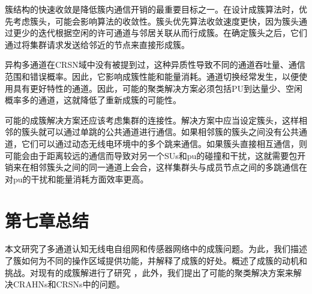 \documentclass[a4paper,AutoFakeBold,oneside,12pt]{book}
\begin{document}
  簇结构的快速收敛是降低簇内通信开销的最重要目标之一。在设计成簇算法时，优先考虑簇头，可能会影响算法的收敛性。簇头优先算法收敛速度更快，因为簇头通过更少的迭代根据空闲的许可通道与邻居关联从而行成簇。在确定簇头之后，它们通过将集群请求发送给邻近的节点来直接形成簇。
  
  异构多通道在CRSN域中没有被提到过，这种异质性导致不同的通道吞吐量、通信范围和错误概率。因此，它影响成簇性能和能量消耗。通道切换经常发生，以便使用具有更好特性的通道。因此，可能的聚类解决方案必须包括PU到达量少、空闲概率多的通道，这就降低了重新成簇的可能性。
  
  可能的成簇解决方案还应该考虑集群的连接性。解决方案中应当设定簇头，这样相邻的簇头就可以通过单跳的公共通道进行通信。如果相邻簇的簇头之间没有公共通道，它们可以通过动态无线电环境中的多个跳来通信。如果簇头直接相互通信，则可能会由于距离较远的通信而导致对另一个SUs和pu的碰撞和干扰，这就需要包开销来在相邻簇头之间的同一通道上会合，这样集群头与成员节点之间的多跳通信在对pu的干扰和能量消耗方面效率更高。
  
\chapter*{第七章\quad{}总结}
 
  本文研究了多通道认知无线电自组网和传感器网络中的成簇问题。为此，我们描述了簇如何为不同的操作区域提供功能，并解释了成簇的好处。概述了成簇的动机和挑战。对现有的成簇解进行了研究
  ，此外，我们提出了可能的聚类解决方案来解决CRAHNs和CRSNs中的问题。
\thispagestyle{empty}
\begin{center}


\end{center}

 


 
\end{document}
